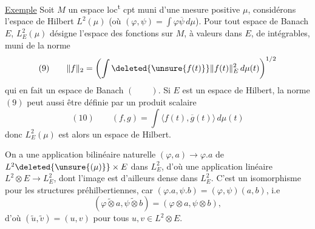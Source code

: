 

\uline{Exemple} Soit $M$ un espace loc\textsuperscript{t} cpt muni d'une
mesure positive $\mu$, considérons l'espace de Hilbert
$L^2(\mu)$ (où $(\varphi,\psi)=\int\varphi\overline\psi\,d\mu$).
Pour tout espace de Banach $E$, $L^2_E(\mu)$ désigne l'espace des
fonctions sur $M$, à valeurs dans $E$, de 
intégrables, muni de la norme
\[
(9)\qquad
\|f\|_2=\left(\int \deleted{\unsure{f(t)}}\|f(t)\|_E^2\,d\mu(t)\right)^{1/2}
\]
qui en fait un espace de Banach $(\qquad)$. Si
$E$ est un espace de Hilbert, la norme $(9)$ peut
aussi être définie par un produit scalaire
\[
(10)\qquad (f,g)=\int\langle f(t),\overline g(t)\rangle\,d\mu(t)
\]
donc $L^2_E(\mu)$ est alors un espace de Hilbert.

On a une application bilinéaire naturelle
$(\varphi,a)\longrightarrow\varphi.a$ de $L^2\deleted{\unsure{(\mu)}}\times E$ dans $L^2_E$,
d'où une application linéaire 
$L^2\otimes E\longrightarrow L^2_E$, dont
l'image est d'ailleurs dense dans $L^2_E$. 
 C'est un isomorphisme pour les structures
préhilbertiennes, car 
$(\varphi.a,\psi.b)=(\varphi,\psi)(a,b)$,
i.e
\[
(\widetilde{\varphi\otimes a},\widetilde{\psi\otimes b})
=(\varphi\otimes a,\psi\otimes b),
\]
d'où  $(\widetilde u,\widetilde v)=(u,v)$
pour tous $u,v\in L^2\otimes E$.
